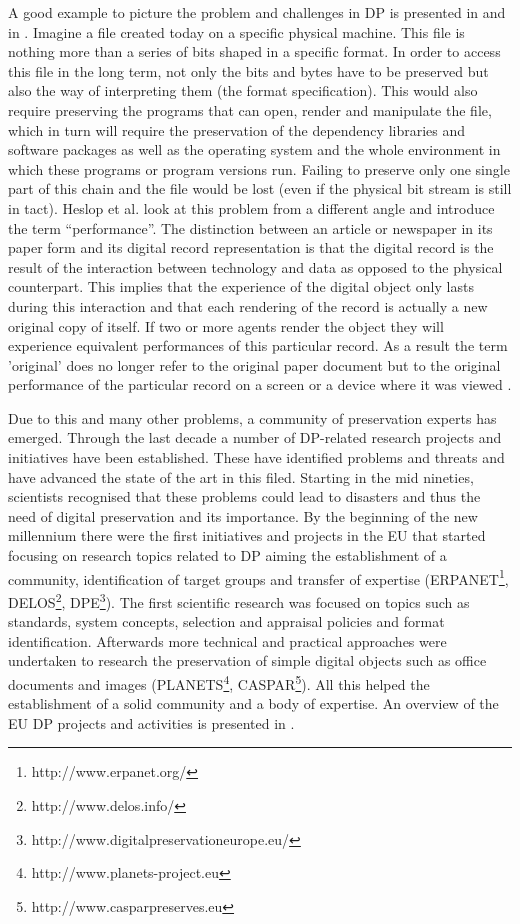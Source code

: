 A good example to picture the problem and challenges in DP is presented in \cite{Lorie:2001:LTP:379437.379726} and in \cite{Rauber:2009:dpchallenges}. Imagine a file created today on a specific physical machine. This file is nothing more than a series of bits shaped in a specific format. In order to access this file in the long term, not only the bits and bytes have to be preserved but also the way of interpreting them (the format specification). This would also require preserving the programs that can open, render and manipulate the file, which in turn will require the preservation of the dependency libraries and software packages as well as the operating system and the whole environment in which these programs or program versions run. Failing to preserve only one single part of this chain and the file would be lost (even if the physical bit stream is still in tact). Heslop et al. look at this problem from a different angle and introduce the term ``performance''. The distinction between an article or newspaper in its paper form and its digital record representation is that the digital record is the result of the interaction between technology and data as opposed to the physical counterpart. This implies that the experience of the digital object only lasts during this interaction and that each rendering of the record is actually a new original copy of itself. If two or more agents render the object they will experience equivalent performances of this particular record. As a result the term 'original' does no longer refer to the original paper document but to the original performance of the particular record on a screen or a device where it was viewed \cite{nla.cat-vn3423702}.

Due to this and many other problems, a community of preservation experts has emerged.
Through the last decade a number of DP-related research projects and initiatives have been established.
These have identified problems and threats and have advanced the state of the art in this filed.
Starting in the mid nineties, scientists recognised that these problems could lead to disasters and thus the need of digital preservation and its importance.
By the beginning of the new millennium there were the first initiatives and projects in the EU that started focusing on research topics related to DP aiming the establishment of a community, identification of target groups and transfer of expertise (ERPANET\footnote{http://www.erpanet.org/}, DELOS\footnote{http://www.delos.info/}, DPE\footnote{http://www.digitalpreservationeurope.eu/}).
The first scientific research was focused on topics such as standards, system concepts, selection and appraisal policies and format identification.
Afterwards more technical and practical approaches were undertaken to research the preservation of simple digital objects such as office documents and images (PLANETS\footnote{http://www.planets-project.eu}, CASPAR\footnote{http://www.casparpreserves.eu}).
All this helped the establishment of a solid community and a body of expertise.
An overview of the EU DP projects and activities is presented in \cite{strodl:2011:dpreport}.


